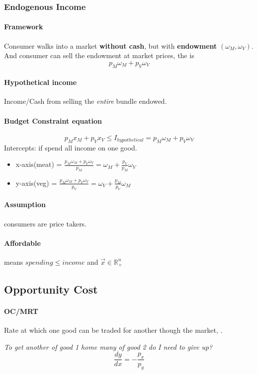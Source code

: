 \documentclass{article}
\begin{document}
	\subsubsection{Endogenous Income}
	\paragraph{Framework} Consumer walks into a market \textbf{without cash}, but with \textbf{endowment} $(\omega_M, \omega_V)$. And consumer can sell the endowment at market prices, the  is
	\[
		p_M \omega_M + p_V \omega_V
	\]
	\paragraph{Hypothetical income} Income/Cash from selling the \emph{entire} bundle endowed. 
	\paragraph{Budget Constraint equation}
	\[
		p_M x_M + p_V x_V \leq I_{hypothetical} = p_M \omega_M + p_V \omega_V
	\]
	Intercepts: if spend all income on one good.
	\begin{itemize}
		\item x-axis(meat) = $\frac{p_M \omega_M + p_V \omega_V}{p_M} = \omega_M + \frac{p_V}{p_M}\omega_V$
		\item y-axis(veg) = $\frac{p_M \omega_M + p_V \omega_V}{p_V} = \omega_V + \frac{p_M}{p_V}\omega_M$
	\end{itemize}
	\paragraph{Assumption} consumers are price takers.
	\paragraph{Affordable} means $spending \leq income$ and $\vec{x} \in \mathbb{R}^n_{+}$
	\subsection{Opportunity Cost}
	\paragraph{OC/MRT} Rate at which one good can be traded for another though the market, .
	
	\emph{To get another  of good 1 home many  of good 2 do I need to give up?}
	\[
		\frac{dy}{dx} = -\frac{p_x}{p_y}
	\]
\end{document}
